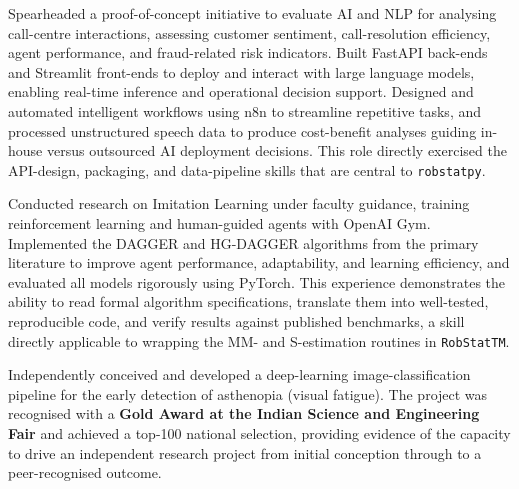 \documentclass[11pt, a4paper]{article}
\begin{document}
\begin{description}[style=nextline, leftmargin=0pt, itemsep=8pt]

  \item[\normalfont\textbf{IT Risk Management and Analyst Intern,
        Virginia Department of Motor Vehicles}
        ]
  \begin{sloppypar}
  Spearheaded a proof-of-concept initiative to evaluate AI and NLP for
  analysing call-centre interactions, assessing customer sentiment,
  call-resolution efficiency, agent performance, and fraud-related risk
  indicators.
  Built FastAPI back-ends and Streamlit front-ends to deploy and interact
  with large language models, enabling real-time inference and operational
  decision support.
  Designed and automated intelligent workflows using n8n to streamline
  repetitive tasks, and processed unstructured speech data to produce
  cost-benefit analyses guiding in-house versus outsourced AI deployment
  decisions.
  This role directly exercised the API-design, packaging, and data-pipeline
  skills that are central to \texttt{robstatpy}.
  \end{sloppypar}

  \item[\normalfont\textbf{Undergraduate Research Volunteer,
        University of Michigan -- Imitation Learning}
        ]
  \begin{sloppypar}
  Conducted research on Imitation Learning under faculty guidance, training
  reinforcement learning and human-guided agents with OpenAI Gym.
  Implemented the DAGGER and HG-DAGGER algorithms from the primary literature
  to improve agent performance, adaptability, and learning efficiency, and
  evaluated all models rigorously using PyTorch.
  This experience demonstrates the ability to read formal algorithm
  specifications, translate them into well-tested, reproducible code,
  and verify results against published benchmarks, a skill directly
  applicable to wrapping the MM- and S-estimation routines in
  \texttt{RobStatTM}.
  \end{sloppypar}

  \item[\normalfont\textbf{Deep Learning Algorithm for Asthenopia Detection}
        ]
  \begin{sloppypar}
  Independently conceived and developed a deep-learning image-classification
  pipeline for the early detection of asthenopia (visual fatigue).
  The project was recognised with a \textbf{Gold Award at the Indian Science
  and Engineering Fair} and achieved a top-100 national selection, providing
  evidence of the capacity to drive an independent research project from
  initial conception through to a peer-recognised outcome.
  \end{sloppypar}

\end{description}
\end{document}

